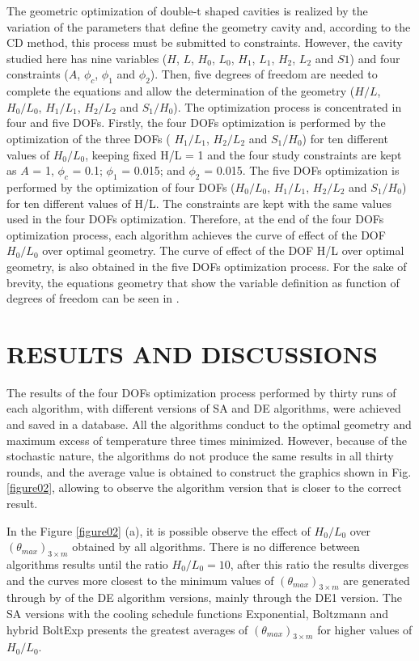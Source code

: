 \documentclass[12pt,fleqn]{article}
\begin{document}
The geometric optimization of double-t shaped cavities is realized by the variation of the parameters that define the geometry cavity and, according to the CD method, this process must be submitted to constraints. However, the cavity studied here has nine variables ($H$, $L$, $H_{0}$, $L_{0}$, $H_{1}$, $L_{1}$, $H_{2}$, $L_{2}$ and $S1$) and four constraints ($A$, $\phi_{c}$, $\phi_{1}$ and $\phi_{2}$). Then, five degrees of freedom are needed to complete the equations and allow the determination of the geometry ($H/L$, $H_{0}/L_{0}$, $H_{1}/L_{1}$, $H_{2}/L_{2}$ and $S_{1}/H_{0}$). The optimization process is concentrated in four and five DOFs. Firstly, the four DOFs optimization is performed by the optimization of the three DOFs ( $H_{1}/L_{1}$, $H_{2}/L_{2}$ and $S_{1}/H_{0}$) for ten different values of $H_{0}/L_{0}$,  keeping fixed  H/L = 1 and the four study constraints are kept as $A$ = 1, $\phi_{c}$ = 0.1; $\phi_{1}$ = 0.015; and $\phi_{2}$ = 0.015. The five DOFs optimization is performed by the optimization of four DOFs ($H_{0}/L_{0}$, $H_{1}/L_{1}$, $H_{2}/L_{2}$ and $S_{1}/H_{0}$) for ten different values of H/L.  The constraints are kept with the same values used in the four  DOFs optimization. Therefore, at the end of the four  DOFs optimization process, each algorithm achieves the curve of effect of the DOF  $H_{0}/L_{0}$ over optimal geometry. The curve of effect of the DOF H/L over optimal geometry, is also obtained in the five DOFs optimization process. For the sake of brevity, the equations geometry that show the variable definition as function of degrees of freedom can be seen in \cite{Gonzales2015b}.

\section{RESULTS AND DISCUSSIONS}

The results of the four DOFs optimization process performed by thirty runs of each algorithm, with different versions of SA and DE algorithms, were achieved and saved in a database. All the algorithms conduct to the optimal geometry and maximum excess of temperature three times minimized. However, because of the stochastic nature, the algorithms do not produce the same results in all thirty rounds, and the average value is obtained to construct the graphics shown in Fig. \ref{figure02}, allowing to observe the algorithm version that is closer to the correct result.


In the Figure \ref{figure02} (a), it is possible observe the effect of $H_{0}/L_{0}$ over $({\theta}_{max})_{3\times m}$ obtained by all algorithms. There is no difference between algorithms results until the ratio $H_{0}/L_{0}=10$, after this ratio the results diverges and the curves more closest to the minimum values of $({\theta}_{max})_{3\times m}$ are generated through by of the DE algorithm versions, mainly through the DE1 version. The SA versions with the cooling schedule functions Exponential, Boltzmann and hybrid BoltExp presents the greatest averages of  $({\theta}_{max})_{3\times m}$  for higher values of $H_{0}/L_{0}$. 
\end{document}
